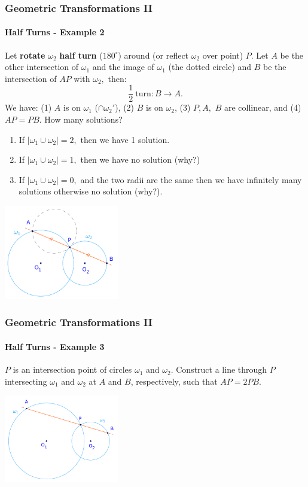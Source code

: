 \documentclass[8pt,xcolor=table,dvipsnames]{beamer}
\newcommand{\dg}{^\circ}
\begin{document}
\begin{frame}[t]
    \frametitle{Geometric Transformations II}
    \framesubtitle{Half Turns - Example 2}
    \begin{overprint}
        Let \textbf{rotate} $\omega_2$ \textbf{half turn} ($180\dg$) around (or reflect $\omega_2$ over point) $P$.
        \bigbreak
        Let $A$ be the other intersection of $\omega_1$ and the image of $\omega_1$ (the dotted circle)
        and $B$ be the intersection of $AP$ with $\omega_2,$ then:
        \[
            \frac{1}{2}\ \text{turn}: B \rightarrow A.
        \]
        \bigbreak
        We have: (1) $A$ is on $\omega_1$ ($\cap \omega_2'$), (2) $B$ is on $\omega_2$, (3) $P, A,$ $B$ are collinear,
        and (4) $AP = PB$.
        How many solutions?
        \begin{enumerate}
            \item If $|\omega_1 \cup \omega_2| = 2,$ then we have 1 solution.
            \item If $|\omega_1 \cup \omega_2| = 1,$ then we have no solution (why?)
            \item If $|\omega_1 \cup \omega_2| = 0,$ and the two radii are the same then we have infinitely many solutions
            otherwise no solution (why?).
        \end{enumerate}
    \end{overprint}    
    \begin{center}
        \includegraphics[width=5cm]{./svg/pdf/rotation-1b.pdf}
    \end{center}
\end{frame}

\begin{frame}[t]
    \frametitle{Geometric Transformations II}
    \framesubtitle{Half Turns - Example 3}
    \begin{example}
        $P$ is an intersection point of circles $\omega_1$ and $\omega_2$.
        Construct a line through $P$ intersecting $\omega_1$ and $\omega_2$ at $A$ and $B$, respectively,
        such that $AP = 2PB.$
    \end{example}

    \begin{center}
        \includegraphics[width=5cm]{./svg/pdf/rotation-2a.pdf}
    \end{center}
\end{frame}
\end{document}
